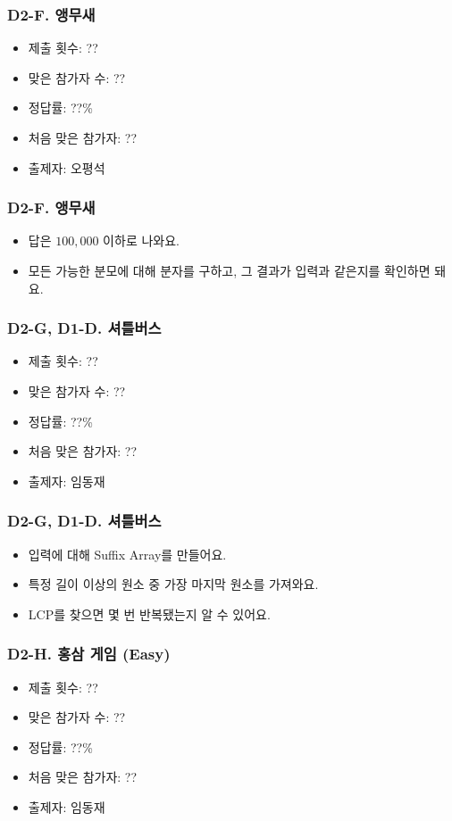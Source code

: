\documentclass[xetex]{beamer}
\begin{document}
\begin{frame}
  \frametitle{D2-F. 앵무새}
  \begin{itemize}
    \item 제출 횟수: ??
    \item 맞은 참가자 수: ??
    \item 정답률: ??\%
    \item 처음 맞은 참가자: ??
    \item 출제자: 오평석
  \end{itemize}
\end{frame}

\begin{frame}
  \frametitle{D2-F. 앵무새}
  \begin{itemize}
    \item 답은 $100,000$ 이하로 나와요.
    \item 모든 가능한 분모에 대해 분자를 구하고, 그 결과가 입력과 같은지를 확인하면 돼요.
  \end{itemize}
\end{frame}

\begin{frame}
  \frametitle{D2-G, D1-D. 셔틀버스}
  \begin{itemize}
    \item 제출 횟수: ??
    \item 맞은 참가자 수: ??
    \item 정답률: ??\%
    \item 처음 맞은 참가자: ??
    \item 출제자: 임동재
  \end{itemize}
\end{frame}

\begin{frame}
  \frametitle{D2-G, D1-D. 셔틀버스}
  \begin{itemize}
    \item 입력에 대해 Suffix Array를 만들어요.
    \item 특정 길이 이상의 원소 중 가장 마지막 원소를 가져와요.
    \item LCP를 찾으면 몇 번 반복됐는지 알 수 있어요.
  \end{itemize}
\end{frame}

\begin{frame}
  \frametitle{D2-H. 홍삼 게임 (Easy)}
  \begin{itemize}
    \item 제출 횟수: ??
    \item 맞은 참가자 수: ??
    \item 정답률: ??\%
    \item 처음 맞은 참가자: ??
    \item 출제자: 임동재
  \end{itemize}
\end{frame}
\end{document}
